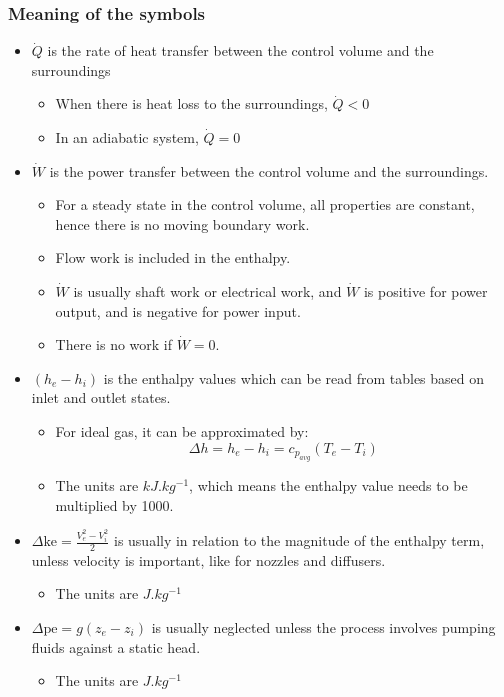 \documentclass[11pt]{article}
\begin{document}
\newpage

\subsubsection{Meaning of the symbols}
\label{sec:orga265d5a}
\begin{itemize}
\item \(\dot{Q}\) is the rate of heat transfer between the control volume and the surroundings
\begin{itemize}
\item When there is heat loss to the surroundings, \(\dot{Q} < 0\)
\item In an adiabatic system, \(\dot{Q} = 0\)
\end{itemize}

\item \(\dot{W}\) is the power transfer between the control volume and the surroundings.
\begin{itemize}
\item For a steady state in the control volume, all properties are constant, hence there is no moving boundary work.
\item Flow work is included in the enthalpy.
\item \(\dot{W}\) is usually shaft work or electrical work, and \(\dot{W}\) is positive for power output, and is negative for power input.
\item There is no work if \(\dot{W} = 0\).
\end{itemize}

\item \(\left(h_e - h_i \right)\) is the enthalpy values which can be read from tables based on inlet and outlet states.
\begin{itemize}
\item For ideal gas, it can be approximated by:
\[\Delta h = h_e - h_i = c_{p_{avg}} \left(T_e - T_i \right)\]

\item The units are \(\unit{kJ.kg^{-1}}\), which means the enthalpy value needs to be multiplied by 1000.
\end{itemize}

\item \(\Delta \text{ke} = \frac{V_e^2 - V_i^2}{2}\) is usually in relation to the magnitude of the enthalpy term, unless velocity is important, like for nozzles and diffusers.
\begin{itemize}
\item The units are \(\unit{J.kg^{-1}}\)
\end{itemize}

\item \(\Delta \text{pe} = g \left(z_e - z_i \right)\) is usually neglected unless the process involves pumping fluids against a static head.
\begin{itemize}
\item The units are \(\unit{J.kg^{-1}}\)
\end{itemize}
\end{itemize}
\end{document}
